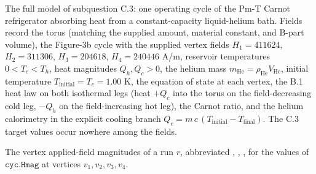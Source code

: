 \begin{definition}
\label{def:IPhO2026Problems_problem_IPhO_2026_3_C_3:PotassiumChromateCoolingRun}
The full model of subquestion C.3: one operating cycle of the Pm-T Carnot
refrigerator absorbing heat from a constant-capacity liquid-helium bath.
Fields record the torus (matching the supplied amount, material constant, and
B-part volume), the Figure-3b cycle with the supplied vertex fields
$H_1 = 411624$, $H_2 = 311306$, $H_3 = 204618$, $H_4 = 240446$ A/m, reservoir
temperatures $0 < T_c < T_h$, heat magnitudes $Q_h, Q_c > 0$, the helium mass
$m_{\mathrm{He}} = \rho_{\mathrm{He}} V_{\mathrm{He}}$, initial temperature
$T_{\mathrm{initial}} = T_c = 1.00$ K, the equation of state at each vertex,
the B.1 heat law on both isothermal legs (heat $+Q_c$ into the torus on the
field-decreasing cold leg, $-Q_h$ on the field-increasing hot leg), the
Carnot ratio, and the helium calorimetry in the explicit cooling branch
$Q_c = m\,c\,(T_{\mathrm{initial}} - T_{\mathrm{final}})$. The C.3 target
values occur nowhere among the fields.
\end{definition}

\begin{definition}
\label{def:IPhO2026Problems_problem_IPhO_2026_3_C_3:H1}
The vertex applied-field magnitudes of a run $r$, abbreviated
,
,
,
for the values of $\texttt{cyc.Hmag}$ at vertices $v_1, v_2, v_3, v_4$.
\end{definition}

